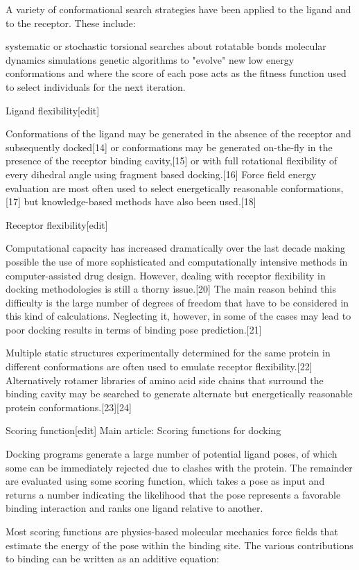 A variety of conformational search strategies have been applied to the ligand and to the receptor. These include:

systematic or stochastic torsional searches about rotatable bonds
molecular dynamics simulations
genetic algorithms to "evolve" new low energy conformations and where the score of each pose acts as the fitness function used to select individuals for the next iteration.

Ligand flexibility[edit]

Conformations of the ligand may be generated in the absence of the receptor and subsequently docked[14] or conformations may be generated on-the-fly in the presence of the receptor binding cavity,[15] or with full rotational flexibility of every dihedral angle using fragment based docking.[16] Force field energy evaluation are most often used to select energetically reasonable conformations,[17] but knowledge-based methods have also been used.[18]

Receptor flexibility[edit]

Computational capacity has increased dramatically over the last decade making possible the use of more sophisticated and computationally intensive methods in computer-assisted drug design. However, dealing with receptor flexibility in docking methodologies is still a thorny issue.[20] The main reason behind this difficulty is the large number of degrees of freedom that have to be considered in this kind of calculations. Neglecting it, however, in some of the cases may lead to poor docking results in terms of binding pose prediction.[21]

Multiple static structures experimentally determined for the same protein in different conformations are often used to emulate receptor flexibility.[22] Alternatively rotamer libraries of amino acid side chains that surround the binding cavity may be searched to generate alternate but energetically reasonable protein conformations.[23][24]

Scoring function[edit]
Main article: Scoring functions for docking

Docking programs generate a large number of potential ligand poses, of which some can be immediately rejected due to clashes with the protein. The remainder are evaluated using some scoring function, which takes a pose as input and returns a number indicating the likelihood that the pose represents a favorable binding interaction and ranks one ligand relative to another.

Most scoring functions are physics-based molecular mechanics force fields that estimate the energy of the pose within the binding site. The various contributions to binding can be written as an additive equation:

